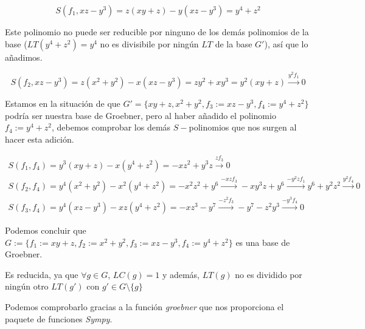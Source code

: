 \documentclass{article}
\begin{document}
\begin{equation} 
S(f_1, xz - y^3) = z(xy + z) - y (xz - y^3) = y^4 + z^2
\end{equation}

Este polinomio no puede ser reducible por ninguno de los demás
polinomios de la base ($LT(y^4 + z^2) = y^4$ no es divisibile por ningún
$LT$ de la base $G'$), así que lo añadimos.

\begin{equation} 
S(f_2, xz - y^3) = z(x^2 + y^2) - x(xz - y^3) = zy^2 + xy^3 = y^2(xy + z) \xrightarrow{y^2f_1} 0
\end{equation}

Estamos en la situación de que
$G'=\{xy + z, x^2 + y^2, f_3:=xz - y^3, f_4:=y^4 + z^2\}$ podría ser
nuestra base de Groebner, pero al haber añadido el polinomio
$f_4:=y^4 + z^2$, debemos comprobar los demás $S-$polinomios que nos
surgen al hacer esta adición.

\begin{equation}
    \begin{array}{l}
        S(f_1, f_4) = y^3(xy+z) - x(y^4+z^2) = -xz^2 + y^3z \xrightarrow{zf_3} 0  \\
        S(f_2, f_4) = y^4(x^2+y^2) - x^2(y^4+z^2) = -x^2z^2 + y^6 \xrightarrow{-xz f_3} -xy^3z+y^6 \xrightarrow{-y^2zf_1} y^6+y^2z^2 \xrightarrow{y^2f_4} 0\\
        S(f_3, f_4) = y^4(xz-y^3) - xz(y^4+z^2) = -xz^3-y^7 \xrightarrow{-z^2 f_3} -y^7 - z^2y^3 \xrightarrow{-y^3f_4} 0
    \end{array}
\end{equation}

Podemos concluir que
$G:=\{f_1:=xy + z, f_2:=x^2 + y^2, f_3:=xz - y^3, f_4:=y^4 + z^2\}$ es
una base de Groebner.

Es reducida, ya que $\forall g\in G$, $LC(g) = 1$ y además, $LT(g)$ no
es dividido por ningún otro $LT(g')$ con $g' \in G \setminus \{g\}$ ~

    Podemos comprobarlo gracias a la función \emph{groebner} que nos
proporciona el paquete de funciones \emph{Sympy}.
\end{document}
